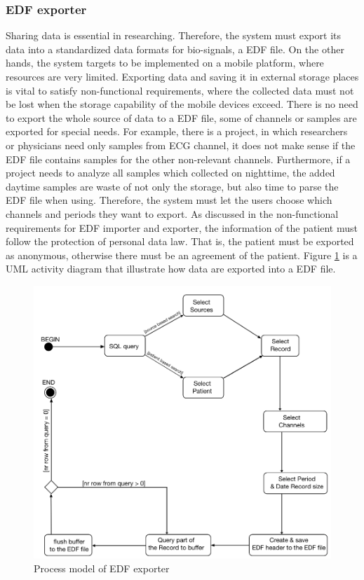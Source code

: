 \subsubsection{EDF exporter}
Sharing data is essential in researching. Therefore, the system must export its data into a standardized data formats for bio-signals, a EDF file. On the other hands, the system targets to be implemented on a mobile platform, where resources are very limited. Exporting data and saving it in external storage places is vital to satisfy non-functional requirements, where the collected data must not be lost when the storage capability of the mobile devices exceed. There is no need to export the whole source of data to a EDF file, some of channels or samples are exported for special needs. For example, there is a project, in which researchers or physicians need only samples from ECG channel, it does not make sense if the EDF file contains samples for the other non-relevant channels. Furthermore, if a project needs to analyze all samples which collected on nighttime, the added daytime samples are waste of not only the storage, but also time to parse the EDF file when using. Therefore, the system must let the users choose which channels and periods they want to export. As discussed in the non-functional requirements for EDF importer and exporter, the information of the patient must follow the protection of personal data law. That is, the patient must be exported as anonymous, otherwise there must be an agreement of the patient. Figure \ref{fig:Figures/EDFExporter} is a UML activity diagram that illustrate how data are exported into a EDF file.
\begin{figure}[ht]
    \centering
    \includegraphics[width=1.0\textwidth]{Figures/EDFExporter.png}
    \caption{Process model of EDF exporter}
    \label{fig:Figures/EDFExporter}
\end{figure}
